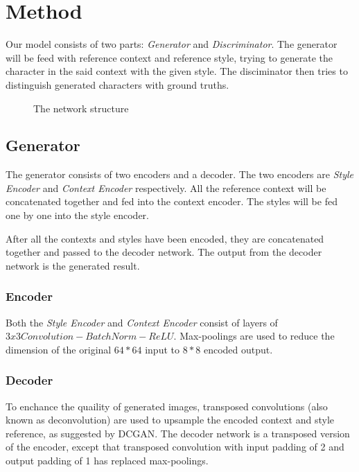 \documentclass[10pt,twocolumn,letterpaper]{article}
\begin{document}
\section{Method}
Our model consists of two parts: \textit{Generator} and \textit{Discriminator}. The generator will be feed with reference context and reference style, trying to generate the character in the said context with the given style. The disciminator then tries to distinguish generated characters with ground truths.

\begin{figure}
	\begin{center}
		\fbox{\rule{0pt}{2in} \rule{.9\linewidth}{0pt}}
	\end{center}
	\caption{The network structure}
	\label{fig:short}
\end{figure}


\subsection{Generator}
The generator consists of two encoders and a decoder. The two encoders are \textit{Style Encoder} and \textit{Context Encoder} respectively. All the reference context will be concatenated together and fed into the context encoder. The styles will be fed one by one into the style encoder. 

After all the contexts and styles have been encoded, they are concatenated together and passed to the decoder network. The output from the decoder network is the generated result.

\subsubsection{Encoder}
Both the \textit{Style Encoder} and \textit{Context Encoder} consist of layers of $3x3Convolution - BatchNorm - ReLU$. Max-poolings are used to reduce the dimension of the original $64*64$ input to $8*8$ encoded output. 

\subsubsection{Decoder}
To enchance the quaility of generated images, transposed convolutions (also known as deconvolution) are used to upsample the encoded context and style reference, as suggested by DCGAN\cite{DBLP:journals/corr/RadfordMC15}. The decoder network is a transposed version of the encoder, except that transposed convolution with input padding of 2 and output padding of 1 has replaced max-poolings.
\end{document}

